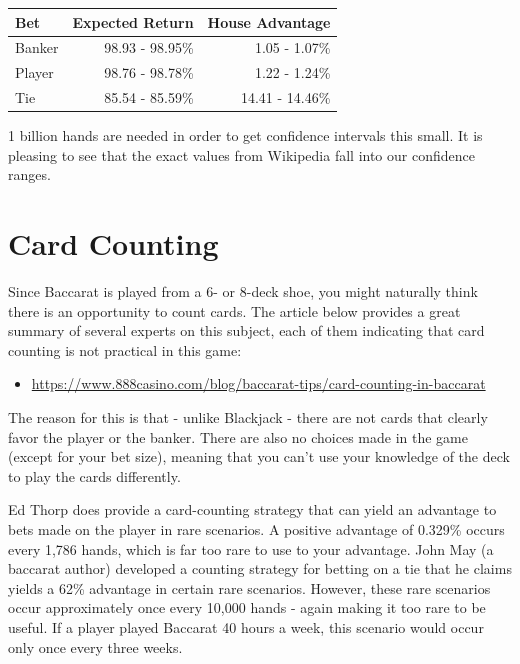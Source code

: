 \documentclass[
]{book}
\providecommand{\tightlist}{%
  \setlength{\itemsep}{0pt}\setlength{\parskip}{0pt}}
\begin{document}
\begin{longtable}[]{@{}lrr@{}}
\toprule
Bet & Expected Return & House Advantage\tabularnewline
\midrule
\endhead
Banker & 98.93 - 98.95\% & 1.05 - 1.07\%\tabularnewline
Player & 98.76 - 98.78\% & 1.22 - 1.24\%\tabularnewline
Tie & 85.54 - 85.59\% & 14.41 - 14.46\%\tabularnewline
\bottomrule
\end{longtable}

1 billion hands are needed in order to get confidence intervals this small. It is pleasing to see that the exact values from Wikipedia fall into our confidence ranges.

\hypertarget{card-counting}{%
\section{Card Counting}\label{card-counting}}

Since Baccarat is played from a 6- or 8-deck shoe, you might naturally think there is an opportunity to count cards. The article below provides a great summary of several experts on this subject, each of them indicating that card counting is not practical in this game:

\begin{itemize}
\tightlist
\item
  \url{https://www.888casino.com/blog/baccarat-tips/card-counting-in-baccarat}
\end{itemize}

The reason for this is that - unlike Blackjack - there are not cards that clearly favor the player or the banker. There are also no choices made in the game (except for your bet size), meaning that you can't use your knowledge of the deck to play the cards differently.

Ed Thorp does provide a card-counting strategy that can yield an advantage to bets made on the player in rare scenarios. A positive advantage of 0.329\% occurs every 1,786 hands, which is far too rare to use to your advantage. John May (a baccarat author) developed a counting strategy for betting on a tie that he claims yields a 62\% advantage in certain rare scenarios. However, these rare scenarios occur approximately once every 10,000 hands - again making it too rare to be useful. If a player played Baccarat 40 hours a week, this scenario would occur only once every three weeks.
\end{document}
